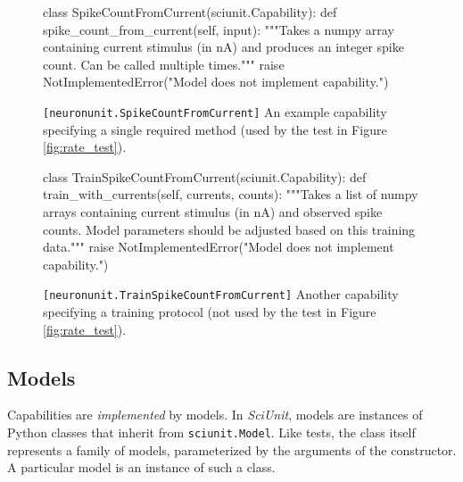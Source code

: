 \documentclass{frontiersSCNS}
\let\verbx\lstinline
\begin{document}
\begin{figure}
\begin{python}
class SpikeCountFromCurrent(sciunit.Capability):
  def spike_count_from_current(self, input): 
    """Takes a numpy array containing current stimulus (in nA) and
    produces an integer spike count. Can be called multiple times."""
    raise NotImplementedError("Model does not implement capability.")
\end{python}
\vspace{-15px}
\caption{\texttt{[neuronunit.SpikeCountFromCurrent]} An example capability specifying a single required method (used by the test in Figure \ref{fig:rate_test}).}
\label{fig:capability}
\vspace{-10px}
\end{figure}
\begin{figure}
\begin{python}
class TrainSpikeCountFromCurrent(sciunit.Capability):
  def train_with_currents(self, currents, counts):
    """Takes a list of numpy arrays containing current stimulus (in nA) and
    observed spike counts. Model parameters should be adjusted based on this
    training data."""
    raise NotImplementedError("Model does not implement capability.")
\end{python}
\vspace{-15px}
\caption{\texttt{[neuronunit.TrainSpikeCountFromCurrent]} Another capability specifying a training protocol (not used by the test in Figure \ref{fig:rate_test}).}
\label{fig:training}
\vspace{-10px}
\end{figure}

\subsection{Models}
Capabilities are \emph{implemented} by models. 
In \textit{SciUnit}, models are instances of Python classes that inherit from \verbx{sciunit.Model}. 
Like tests, the class itself represents a family of models, parameterized by the arguments of the constructor. 
A particular model is an instance of such a class.
\end{document}
